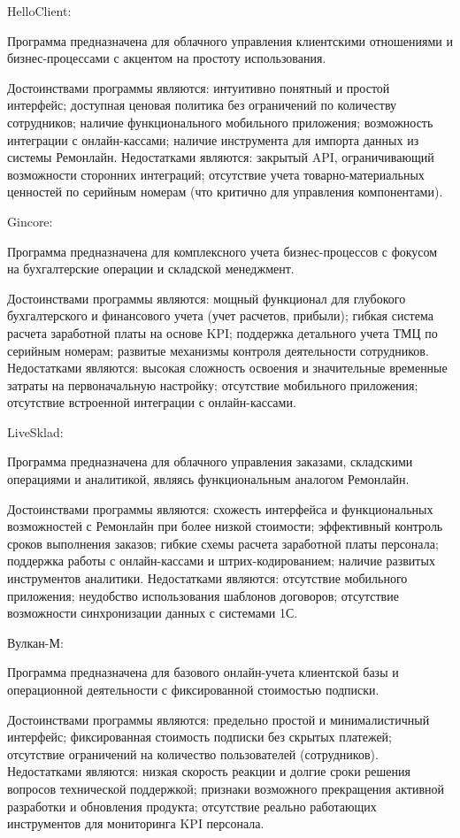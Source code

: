 HelloClient:

Программа предназначена для облачного управления клиентскими отношениями и бизнес-процессами с акцентом на простоту использования.

Достоинствами программы являются: интуитивно понятный и простой интерфейс; доступная ценовая политика без ограничений по количеству сотрудников; наличие функционального мобильного приложения; возможность интеграции с онлайн-кассами; наличие инструмента для импорта данных из системы Ремонлайн.
Недостатками являются: закрытый API, ограничивающий возможности сторонних интеграций; отсутствие учета товарно-материальных ценностей по серийным номерам (что критично для управления компонентами).

Gincore:

Программа предназначена для комплексного учета бизнес-процессов с фокусом на бухгалтерские операции и складской менеджмент.

Достоинствами программы являются: мощный функционал для глубокого бухгалтерского и финансового учета (учет расчетов, прибыли); гибкая система расчета заработной платы на основе KPI; поддержка детального учета ТМЦ по серийным номерам; развитые механизмы контроля деятельности сотрудников.
Недостатками являются: высокая сложность освоения и значительные временные затраты на первоначальную настройку; отсутствие мобильного приложения; отсутствие встроенной интеграции с онлайн-кассами.

LiveSklad:

Программа предназначена для облачного управления заказами, складскими операциями и аналитикой, являясь функциональным аналогом Ремонлайн.

Достоинствами программы являются: схожесть интерфейса и функциональных возможностей с Ремонлайн при более низкой стоимости; эффективный контроль сроков выполнения заказов; гибкие схемы расчета заработной платы персонала; поддержка работы с онлайн-кассами и штрих-кодированием; наличие развитых инструментов аналитики.
Недостатками являются: отсутствие мобильного приложения; неудобство использования шаблонов договоров; отсутствие возможности синхронизации данных с системами 1С.

Вулкан-М:

Программа предназначена для базового онлайн-учета клиентской базы и операционной деятельности с фиксированной стоимостью подписки.

Достоинствами программы являются: предельно простой и минималистичный интерфейс; фиксированная стоимость подписки без скрытых платежей; отсутствие ограничений на количество пользователей (сотрудников).
Недостатками являются: низкая скорость реакции и долгие сроки решения вопросов технической поддержкой; признаки возможного прекращения активной разработки и обновления продукта; отсутствие реально работающих инструментов для мониторинга KPI персонала.

